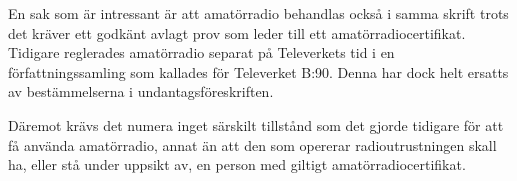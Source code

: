 En sak som är intressant är att amatörradio behandlas också i samma skrift trots det kräver ett godkänt avlagt prov som leder till ett amatörradiocertifikat. Tidigare reglerades amatörradio separat på Televerkets tid i en författningssamling som kallades för Televerket B:90. Denna har dock helt ersatts av bestämmelserna i undantagsföreskriften.

Däremot krävs det numera inget särskilt tillstånd som det gjorde tidigare för att få använda amatörradio, annat än att den som opererar radioutrustningen skall ha, eller stå under uppsikt av, en person med giltigt amatörradiocertifikat.


